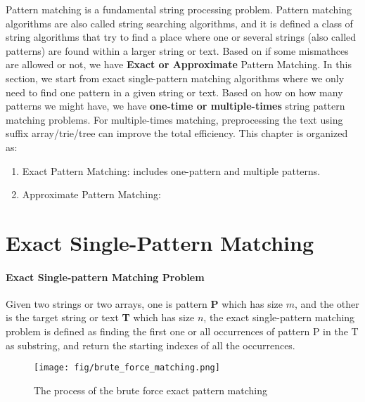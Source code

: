 \documentclass[../main.tex]{subfiles}
\begin{document}
Pattern matching is a fundamental string processing problem. Pattern matching algorithms are also called string searching algorithms, and it is defined a class of string algorithms that try to find a place where one or several strings (also called patterns) are found within a larger string or text. Based on if some mismathces are allowed or not, we have \textbf{Exact or Approximate} Pattern Matching. In this section, we start from exact single-pattern matching algorithms where we only need to find one pattern in a given string or text. 
Based on how on how many patterns we might have, we have \textbf{one-time or multiple-times} string pattern matching problems. For multiple-times matching, preprocessing the text using suffix array/trie/tree can improve the total efficiency.  This chapter is organized as:
\begin{enumerate}
    \item Exact Pattern Matching: includes one-pattern and multiple patterns. 
    \item Approximate Pattern Matching:
\end{enumerate}


\section{Exact Single-Pattern Matching}

\paragraph{Exact Single-pattern Matching Problem}  Given two strings or two arrays, one is pattern \textbf{P} which has size $m$, and the other is the target string or text \textbf{T} which has size $n$, the exact single-pattern matching problem is defined as finding the first one or all occurrences of pattern P in the T as substring, and return the starting indexes of all the occurrences. 

\begin{figure}[h]
    \centering
    \texttt{[image: fig/brute\_force\_matching.png]}
    \caption{The process of the brute force exact pattern matching}
    \label{fig:brute_force_string_matching}
\end{figure}
\end{document}
